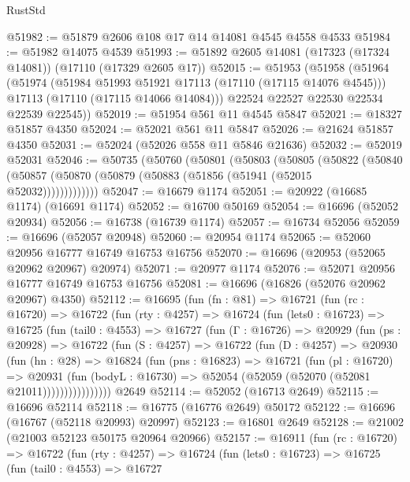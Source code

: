 \begin{lexlean}{RustStd}
\begin{coremodule}
@51982 := @51879 @2606 @108 @17 @14 @14081 @4545 @4558 @4533
@51984 := @51982 @14075 @4539
@51993 := @51892 @2605 @14081 (@17323 (@17324 @14081)) (@17110 (@17329 @2605 @17))
@52015 := @51953
    (@51958
      (@51964
        (@51974
          (@51984 @51993 @51921 @17113 (@17110 (@17115 @14076 @4545)))
          @17113
          (@17110 (@17115 @14066 @14084)))
        @22524
        @22527
        @22530
        @22534
        @22539
        @22545))
@52019 := @51954 @561 @11 @4545 @5847
@52021 := @18327 @51857 @4350
@52024 := @52021 @561 @11 @5847
@52026 := @21624 @51857 @4350
@52031 := @52024 (@52026 @558 @11 @5846 @21636)
@52032 := @52019 @52031
@52046 := @50735
    (@50760
      (@50801
        (@50803
          (@50805
            (@50822
              (@50840 (@50857 (@50870 (@50879 (@50883 (@51856 (@51941 (@52015 @52032)))))))))))))
@52047 := @16679 @1174
@52051 := @20922 (@16685 @1174) (@16691 @1174)
@52052 := @16700 @50169
@52054 := @16696 (@52052 @20934)
@52056 := @16738 (@16739 @1174)
@52057 := @16734 @52056
@52059 := @16696 (@52057 @20948)
@52060 := @20954 @1174
@52065 := @52060 @20956 @16777 @16749 @16753 @16756
@52070 := @16696 (@20953 (@52065 @20962 @20967) @20974)
@52071 := @20977 @1174
@52076 := @52071 @20956 @16777 @16749 @16753 @16756
@52081 := @16696 (@16826 (@52076 @20962 @20967) @4350)
@52112 := @16695
    (fun (fn : @81) =>
    @16721
      (fun (rc : @16720) =>
      @16722
        (fun (rty : @4257) =>
        @16724
          (fun (lets0 : @16723) =>
          @16725
            (fun (tail0 : @4553) =>
            @16727
              (fun (Γ : @16726) =>
              @20929
                (fun (ps : @20928) =>
                @16722
                  (fun (S : @4257) =>
                  @16722
                    (fun (D : @4257) =>
                    @20930
                      (fun (hn : @28) =>
                      @16824
                        (fun (pns : @16823) =>
                        @16721
                          (fun (pl : @16720) =>
                          @20931
                            (fun (bodyL : @16730) =>
                            @52054 (@52059 (@52070 (@52081 @21011))))))))))))))))
    @2649
@52114 := @52052 (@16713 @2649)
@52115 := @16696 @52114
@52118 := @16775 (@16776 @2649) @50172
@52122 := @16696 (@16767 (@52118 @20993) @20997)
@52123 := @16801 @2649
@52128 := @21002 (@21003 @52123 @50175 @20964 @20966)
@52157 := @16911
    (fun (rc : @16720) =>
    @16722
      (fun (rty : @4257) =>
      @16724
        (fun (lets0 : @16723) =>
        @16725
          (fun (tail0 : @4553) =>
          @16727

\end{coremodule}
\end{lexlean}
